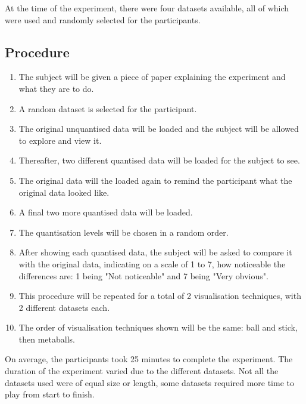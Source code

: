 At the time of the experiment, there were four datasets available, all of which
were used and randomly selected for the participants.


\subsection{Procedure}
\label{sub:experiment_procedure}

\begin{enumerate}

  \item The subject will be given a piece of paper explaining the experiment
  and what they are to do.

  \item A random dataset is selected for the participant.

  \item The original unquantised data will be loaded and the subject will be
  allowed to explore and view it.

  \item Thereafter, two different quantised data will be loaded for the subject
  to see.

  \item The original data will the loaded again to remind the participant what
  the original data looked like.

  \item A final two more quantised data will be loaded.

  \item The quantisation levels will be chosen in a random order.

  \item After showing each quantised data, the subject will be asked to compare
  it with the original data, indicating on a scale of 1 to 7, how noticeable the
  differences are: 1 being "Not noticeable" and 7 being "Very obvious".

  \item This procedure will be repeated for a total of 2 visualisation
  techniques, with 2 different datasets each.

  \item The order of visualisation techniques shown will be the same: ball and
  stick, then metaballs.

\end{enumerate}

On average, the participants took 25 minutes to complete the experiment. The
duration of the experiment varied due to the different datasets. Not all the
datasets used were of equal size or length, some datasets required more time to
play from start to finish.

